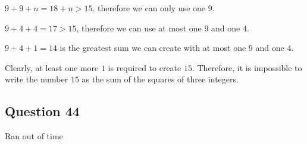 \documentclass[12pt]{article}
\begin{document}
$9 + 9 + n = 18 + n > 15$, therefore we can only use one $9$.

$9 + 4 + 4 = 17 > 15$, therefore we can use at most one $9$ and one $4$.

$9 + 4 + 1 = 14$ is the greatest sum we can create with at most one $9$ and 
one $4$.

Clearly, at least one more $1$ is required to create $15$. Therefore, it is
impossible to write the number $15$ as the sum of the squares of three integers. 

\subsection*{Question 44}

Ran out of time
\end{document}
